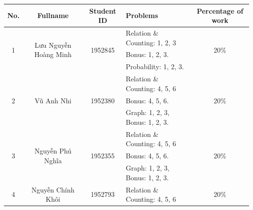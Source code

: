 \documentclass[a4paper]{article}
\begin{document}
\begin{center}
  \begin{tabular}{|c|c|c|l|c|}
    \hline
    \textbf{No.}       & \textbf{Fullname}                      & \textbf{Student ID}      & \textbf{Problems}                             & \textbf{Percentage of work} \\
    \hline
    \multirow{3}{*}{1} & \multirow{3}{*}{Lưu Nguyễn Hoàng Minh} & \multirow{3}{*}{1952845} & \textendash{} Relation \& Counting: 1, 2, 3   & \multirow{3}{*}{20\%}       \\
                       &                                        &                          & Bonus: 1, 2, 3.                               &                             \\
                       &                                        &                          & \textendash{} Probability: 1, 2, 3.           &                             \\
    \hline
    \multirow{3}{*}{2} & \multirow{3}{*}{Vũ Anh Nhi}            & \multirow{3}{*}{1952380} & \textendash{} Relation \& Counting: 4, 5, 6   & \multirow{3}{*}{20\%}       \\
                       &                                        &                          & Bonus: 4, 5, 6.                               &                             \\
                       &                                        &                          & \textendash{} Graph: 1, 2, 3, Bonus: 1, 2, 3. &                             \\
    \hline
    \multirow{3}{*}{3} & \multirow{3}{*}{Nguyễn Phú Nghĩa}      & \multirow{3}{*}{1952355} & \textendash{} Relation \& Counting: 4, 5, 6   & \multirow{3}{*}{20\%}       \\
                       &                                        &                          & Bonus: 4, 5, 6.                               &                             \\
                       &                                        &                          & \textendash{} Graph: 1, 2, 3, Bonus: 1, 2, 3. &                             \\
    \hline
    \multirow{3}{*}{4} & \multirow{3}{*}{Nguyễn Chính Khôi}     & \multirow{3}{*}{1952793} & \textendash{} Relation \& Counting: 4, 5, 6   & \multirow{3}{*}{20\%}       \\

\end{tabular}
\end{center}
\end{document}
